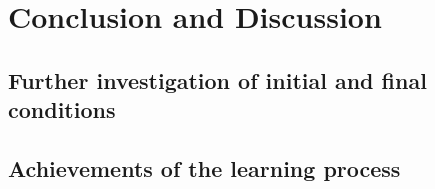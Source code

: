 \newpage
\section{Conclusion and Discussion} \label{sec:ConclusionAndDiscussion}

\subsection{Further investigation of initial and final conditions}

\subsection{Achievements of the learning process}